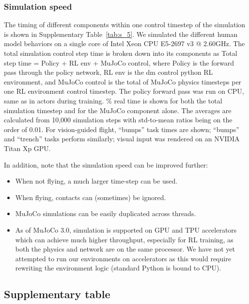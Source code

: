 \documentclass[sn-mathphys-num]{sn-jnl}%
\theoremstyle{thmstyleone}%
\theoremstyle{thmstyletwo}%
\theoremstyle{thmstylethree}%
\begin{document}
\begin{appendices}
\subsubsection{Simulation speed}

The timing of different components within one control timestep of the simulation is shown in Supplementary Table~\ref{tab:s_5}. 
We simulated the different human model behaviors on a single core of Intel Xeon CPU E5-2697 v3 @ 2.60GHz. 
The total simulation control step time is broken down into its components as Total step time = Policy + RL env + MuJoCo control, where Policy is the forward pass through the policy network, RL env is the dm control python RL environment, and MuJoCo control is the total of MuJoCo physics timesteps per one RL environment control timestep\cite{tunyasuvunakool2020dm_control}. 
The policy forward pass was run on CPU, same as in actors during training. \% real time is shown for both the total simulation timestep and for the MuJoCo component alone. 
The averages are calculated from 10,000 simulation steps with std-to-mean ratios being on the order of 0.01. 
For vision-guided flight, “bumps” task times are shown; “bumps” and “trench” tasks perform similarly; 
visual input was rendered on an NVIDIA Titan Xp GPU.


In addition, note that the simulation speed can be improved further:

\begin{itemize}
	\item When not flying, a much larger time-step can be used.
	\item When flying, contacts can (sometimes) be ignored.
	\item MuJoCo simulations can be easily duplicated across threads.
	\item As of MuJoCo 3.0, simulation is supported on GPU and TPU accelerators which can achieve much higher throughput, especially for RL training, as both the physics and network are on the same processor. 
	We have not yet attempted to run our environments on accelerators as this would require rewriting the environment logic (standard Python is bound to CPU).
\end{itemize}


\subsection{Supplementary table}\label{secA1}





\end{appendices}
\end{document}
